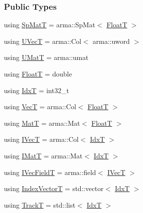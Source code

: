 \subsubsection*{Public Types}
\begin{DoxyCompactItemize}
\item 
using \hyperlink{classtracker_1_1LAPTrack_a85e4da204f0881dd4b46caf38bcef737}{Sp\+MatT} = arma\+::\+Sp\+Mat$<$ \hyperlink{classtracker_1_1Tracker_a66e8a81f12871e23082264c964f8f103}{FloatT} $>$
\item 
using \hyperlink{classtracker_1_1LAPTrack_aa2a2232f3db006d28422e54b9f236945}{U\+VecT} = arma\+::\+Col$<$ arma\+::uword $>$
\item 
using \hyperlink{classtracker_1_1LAPTrack_a24e342e3b28213ea690b9bb806fc380e}{U\+MatT} = arma\+::umat
\item 
using \hyperlink{classtracker_1_1Tracker_a66e8a81f12871e23082264c964f8f103}{FloatT} = double
\item 
using \hyperlink{classtracker_1_1Tracker_ad39a875dc6957cb6a9f3affcf6517d80}{IdxT} = int32\+\_\+t
\item 
using \hyperlink{classtracker_1_1Tracker_a9905fa9b81b252716e651d87d7d57aff}{VecT} = arma\+::\+Col$<$ \hyperlink{classtracker_1_1Tracker_a66e8a81f12871e23082264c964f8f103}{FloatT} $>$
\item 
using \hyperlink{classtracker_1_1Tracker_a60a1d6ee07284ba82f0533c79311ccfd}{MatT} = arma\+::\+Mat$<$ \hyperlink{classtracker_1_1Tracker_a66e8a81f12871e23082264c964f8f103}{FloatT} $>$
\item 
using \hyperlink{classtracker_1_1Tracker_a59a6e01be987f9c0093a8ac5ad97ce33}{I\+VecT} = arma\+::\+Col$<$ \hyperlink{classtracker_1_1Tracker_ad39a875dc6957cb6a9f3affcf6517d80}{IdxT} $>$
\item 
using \hyperlink{classtracker_1_1Tracker_a6de023cd3b5466996624c7e1b7e5d551}{I\+MatT} = arma\+::\+Mat$<$ \hyperlink{classtracker_1_1Tracker_ad39a875dc6957cb6a9f3affcf6517d80}{IdxT} $>$
\item 
using \hyperlink{classtracker_1_1Tracker_a122e1d351fcb4444aec9729cf7625322}{I\+Vec\+FieldT} = arma\+::field$<$ \hyperlink{classtracker_1_1Tracker_a59a6e01be987f9c0093a8ac5ad97ce33}{I\+VecT} $>$
\item 
using \hyperlink{classtracker_1_1Tracker_a50ae514521f940c08813b45f53b6ce2d}{Index\+VectorT} = std\+::vector$<$ \hyperlink{classtracker_1_1Tracker_ad39a875dc6957cb6a9f3affcf6517d80}{IdxT} $>$
\item 
using \hyperlink{classtracker_1_1Tracker_ac1b06aee1b9d85fb75cf6a9579eb0e84}{TrackT} = std\+::list$<$ \hyperlink{classtracker_1_1Tracker_ad39a875dc6957cb6a9f3affcf6517d80}{IdxT} $>$

\end{DoxyCompactItemize}
